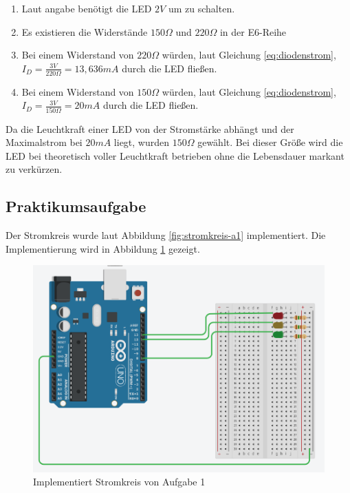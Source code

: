 \documentclass[11pt]{article}
\begin{document}
    \begin{enumerate}
        \item Laut angabe benötigt die LED $2V$ um zu schalten.
        \item Es existieren die Widerstände $150\Omega$ und $220\Omega$ in der E6-Reihe
        \item Bei einem Widerstand von $220\Omega$ würden, laut Gleichung \ref{eq:diodenstrom}, $I_D = \frac{3V}{220\Omega} = 13,636mA$ durch die LED fließen.
        \item Bei einem Widerstand von $150\Omega$ würden, laut Gleichung \ref{eq:diodenstrom}, $I_D = \frac{3V}{150\Omega} = 20mA$ durch die LED fließen.
    \end{enumerate}
    Da die Leuchtkraft einer LED von der Stromstärke abhängt und der Maximalstrom bei $20mA$ liegt, wurden $150\Omega$ gewählt.
    Bei dieser Größe wird die LED bei theoretisch voller Leuchtkraft betrieben ohne die Lebensdauer markant zu verkürzen.

    \subsection{Praktikumsaufgabe}
    \label{subsec:praktikumsaufgabe}

    Der Stromkreis wurde laut Abbildung \ref{fig:stromkreis-a1} implementiert.
    Die Implementierung wird in Abbildung \ref{fig:implementierung-a1} gezeigt.

    \begin{figure}[h]
        \centering
        \includegraphics[width=\textwidth]{pictures/a1-praktik.png}
        \caption{Implementiert Stromkreis von Aufgabe 1}
        \label{fig:implementierung-a1}
    \end{figure}
\end{document}
